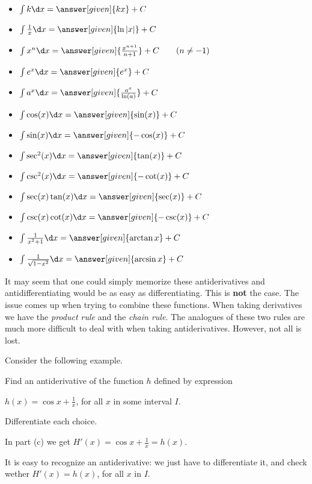 \documentclass{ximera}
\begin{document}
\begin{theorem}\hfil
\begin{itemize}
\item $\int k \d x= \answer[given]{k x}+C$
\item $\int \frac{1}{x} \d x= \answer[given]{\ln|x|}+C$
\item $\int x^n \d x= \answer[given]{\frac{x^{n+1}}{n+1}}+C\qquad(n\ne-1)$
\item $\int e^x \d x= \answer[given]{e^x} + C$
\item $\int a^x \d x= \answer[given]{\frac{a^x}{\ln(a)}}+C$
\item $\int \cos(x) \d x = \answer[given]{\sin(x)} + C$
\item $\int \sin(x) \d x = \answer[given]{-\cos(x)} + C$  
\item $\int \sec^2(x) \d x = \answer[given]{\tan(x)} + C$
\item $\int \csc^2(x) \d x = \answer[given]{-\cot(x)} + C$
\item $\int \sec(x)\tan(x) \d x = \answer[given]{\sec(x)} + C$
\item $\int \csc(x)\cot(x) \d x = \answer[given]{-\csc(x)} + C$
\item $\int \frac{1}{x^2+1}\d x = \answer[given]{\arctan{x}} + C$
\item $\int \frac{1}{\sqrt{1-x^2}}\d x= \answer[given]{\arcsin{x}}+C$
\end{itemize}
\end{theorem}


It may seem that one could simply memorize these antiderivatives and
antidifferentiating would be as easy as differentiating. This is
\textbf{not} the case. The issue comes up when trying to combine these
functions.  When taking derivatives we have the \textit{product rule}
and the \textit{chain rule}. The analogues of these two rules are much
more difficult to deal with when taking antiderivatives. However, not
all is lost. 

Consider the following example.
\begin{example}
  Find  an antiderivative of the function $h$ defined by expression
  
   $h(x)=\cos{x}+\frac{1}{x}$, for all $x$ in some interval $I$.
  \begin{multipleChoice}
  \end{multipleChoice}
  \begin{feedback}
    Differentiate each choice.
    
     In part (c) we get $H'(x)=\cos{x}+\frac{1}{x}=h(x)$.
  \end{feedback}
\end{example}
It is easy to recognize an antiderivative: we just have to differentiate it, and check wether $H'(x)=h(x)$, for all $x$ in $I$.
\end{document}
